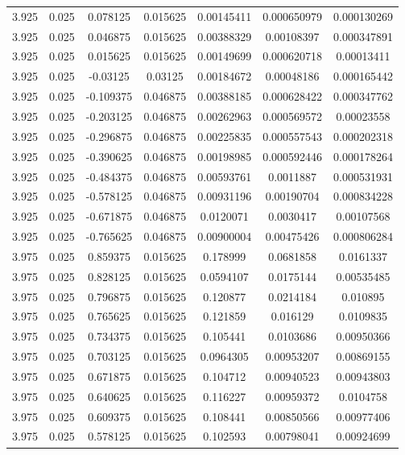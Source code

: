 \begin{flushleft}
\begin{longtable}{ccccccc}
3.925 & 0.025 & 0.078125 & 0.015625 & 0.00145411 & 0.000650979 & 0.000130269  \\ 
3.925 & 0.025 & 0.046875 & 0.015625 & 0.00388329 & 0.00108397 & 0.000347891  \\ 
3.925 & 0.025 & 0.015625 & 0.015625 & 0.00149699 & 0.000620718 & 0.00013411  \\ 
3.925 & 0.025 & -0.03125 & 0.03125 & 0.00184672 & 0.00048186 & 0.000165442  \\ 
3.925 & 0.025 & -0.109375 & 0.046875 & 0.00388185 & 0.000628422 & 0.000347762  \\ 
3.925 & 0.025 & -0.203125 & 0.046875 & 0.00262963 & 0.000569572 & 0.00023558  \\ 
3.925 & 0.025 & -0.296875 & 0.046875 & 0.00225835 & 0.000557543 & 0.000202318  \\ 
3.925 & 0.025 & -0.390625 & 0.046875 & 0.00198985 & 0.000592446 & 0.000178264  \\ 
3.925 & 0.025 & -0.484375 & 0.046875 & 0.00593761 & 0.0011887 & 0.000531931  \\ 
3.925 & 0.025 & -0.578125 & 0.046875 & 0.00931196 & 0.00190704 & 0.000834228  \\ 
3.925 & 0.025 & -0.671875 & 0.046875 & 0.0120071 & 0.0030417 & 0.00107568  \\ 
3.925 & 0.025 & -0.765625 & 0.046875 & 0.00900004 & 0.00475426 & 0.000806284  \\ 
3.975 & 0.025 & 0.859375 & 0.015625 & 0.178999 & 0.0681858 & 0.0161337  \\ 
3.975 & 0.025 & 0.828125 & 0.015625 & 0.0594107 & 0.0175144 & 0.00535485  \\ 
3.975 & 0.025 & 0.796875 & 0.015625 & 0.120877 & 0.0214184 & 0.010895  \\ 
3.975 & 0.025 & 0.765625 & 0.015625 & 0.121859 & 0.016129 & 0.0109835  \\ 
3.975 & 0.025 & 0.734375 & 0.015625 & 0.105441 & 0.0103686 & 0.00950366  \\ 
3.975 & 0.025 & 0.703125 & 0.015625 & 0.0964305 & 0.00953207 & 0.00869155  \\ 
3.975 & 0.025 & 0.671875 & 0.015625 & 0.104712 & 0.00940523 & 0.00943803  \\ 
3.975 & 0.025 & 0.640625 & 0.015625 & 0.116227 & 0.00959372 & 0.0104758  \\ 
3.975 & 0.025 & 0.609375 & 0.015625 & 0.108441 & 0.00850566 & 0.00977406  \\ 
3.975 & 0.025 & 0.578125 & 0.015625 & 0.102593 & 0.00798041 & 0.00924699  \\ 

\end{longtable}
\end{flushleft}
